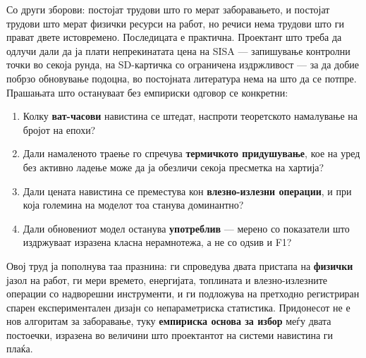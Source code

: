 Со други зборови: постојат трудови што го мерат заборавањето, и постојат трудови што мерат
физички ресурси на работ, но речиси нема трудови што ги прават двете истовремено.
Последицата е практична. Проектант што треба да одлучи дали да ја плати непрекинатата цена
на SISA --- запишување контролни точки во секоја рунда, на SD-картичка со ограничена
издржливост --- за да добие побрзо обновување подоцна, во постојната литература нема на што
да се потпре. Прашањата што остануваат без емпириски одговор се конкретни:

\begin{enumerate}
  \item Колку \textbf{ват-часови} навистина се штедат, наспроти теоретското намалување на бројот на епохи?
  \item Дали намаленото траење го спречува \textbf{термичкото придушување}, кое на уред без активно ладење може да ја обезличи секоја пресметка на хартија?
  \item Дали цената навистина се преместува кон \textbf{влезно-излезни операции}, и при која големина на моделот тоа станува доминантно?
  \item Дали обновениот модел останува \textbf{употреблив} --- мерено со показатели што издржуваат изразена класна нерамнотежа, а не со одѕив и F1?
\end{enumerate}

Овој труд ја пополнува таа празнина: ги спроведува двата пристапа на \textbf{физички} јазол на
работ, ги мери времето, енергијата, топлината и влезно-излезните операции со надворешни
инструменти, и ги подложува на претходно регистриран спарен експериментален дизајн со
непараметриска статистика. Придонесот не е нов алгоритам за заборавање, туку
\textbf{емпириска основа за избор} меѓу двата постоечки, изразена во величини што
проектантот на системи навистина ги плаќа.
